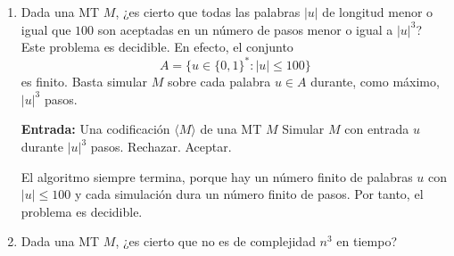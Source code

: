 \documentclass[12pt]{article}
\begin{document}
\begin{ejercicio}[2.4 puntos]
\begin{enumerate}
            Si $M$ no acepta $\langle M\rangle$, entonces $L(M')=\emptyset$, que sí es cerrado por inversión. 
            Por tanto, $\langle M'\rangle\in P_1$. \\

            Si $M$ acepta $\langle M\rangle$, entonces $L(M')=\{01\}$, que no es cerrado por inversión, porque $10\notin L(M')$. 
            Por tanto, $\langle M'\rangle\notin P_1$. \\

            Así,
            $$
            \langle M\rangle\in \text{DIAGONAL}
            \Longleftrightarrow
            \langle M'\rangle\in P_1.
            $$
            Por tanto, $\text{DIAGONAL}\propto P_1$. Como $\text{DIAGONAL}$ no es semidecidible, $P_1$ no es semidecidible.
            
            \newpage

            \item Dada una MT $M$, ¿es cierto que todas las palabras $|u|$ de longitud menor o igual que $100$ son aceptadas en un
            número de pasos menor o igual a $|u|^3$? \\

            Este problema es decidible. En efecto, el conjunto
            $$
            A=\{u\in\{0,1\}^* : |u|\leq 100\}
            $$
            es finito. Basta simular $M$ sobre cada palabra $u\in A$ durante, como máximo, $|u|^3$ pasos.

            \begin{algorithm}
            \caption{Decisor}
            \begin{algorithmic}
            \State \textbf{Entrada:} Una codificación $\langle M\rangle$ de una MT $M$
                \State Simular $M$ con entrada $u$ durante $|u|^3$ pasos.
                    \State Rechazar.
                \EndIf
            \EndFor
            \State Aceptar.
            \end{algorithmic}
            \end{algorithm}

            El algoritmo siempre termina, porque hay un número finito de palabras $u$ con $|u|\leq 100$ y cada simulación dura un número finito de pasos. Por tanto, el problema es decidible.
            
            \item Dada una MT $M$, ¿es cierto que no es de complejidad $n^3$ en tiempo? \\
            

\end{enumerate}
\end{ejercicio}
\end{document}
